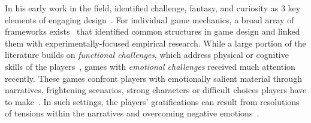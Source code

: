 In his early work in the field, \citeauthor{malone1980} identified challenge, fantasy, and curiosity as $3$ key elements of engaging design~\cite{malone1980}. 
For individual game mechanics, a broad array of frameworks exists~\cite{alexandrovsky2019,garris2002,mora2015,robinson2013} that identified common structures in game design and linked them with experimentally-focused empirical research.
While a large portion of the literature builds on \textit{functional challenges}, which address physical or cognitive skills of the players~\cite{cole2015},
games with \textit{emotional challenges} received much attention recently. These games confront players with emotionally salient material through narratives, frightening scenarios, strong characters or difficult choices players have to make~\cite{cole2015,denisova2017}. 
In such settings, the players' gratifications can result from resolutions of tensions within the narratives and overcoming negative emotions~\cite{bopp2018,cole2015,endress2016,gowler2019}.
